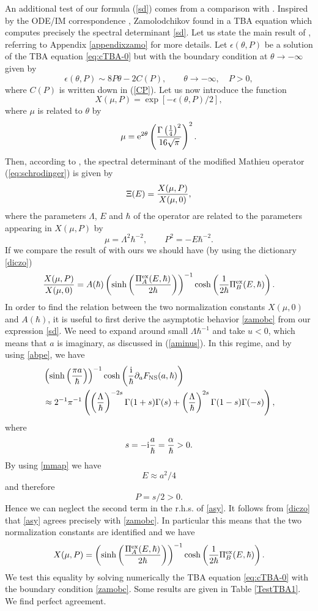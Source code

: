 \documentclass[a4paper,11pt]{article}
\theoremstyle{definition}
\newcommand{\re}{{\rm e}}
\newcommand{\ri}{{\rm i}}
\newcommand{\be}{\begin{equation}}
\newcommand{\ee}{\end{equation}}
\newcommand{\ba}{\begin{aligned}}
\newcommand{\ea}{\end{aligned}}
\begin{document}
\label{comp-zamo}
An additional test of our formula (\ref{sd}) comes from a comparison
with \cite{post-zamo}.  Inspired by the ODE/IM correspondence
\cite{dt,ddt}, Zamolodchikov found in \cite{post-zamo} a TBA equation
which computes precisely the spectral determinant \eqref{sd}. Let us
state the main result of \cite{post-zamo}, referring to Appendix
\ref{appendixzamo} for more details. Let $\epsilon(\theta, P)$ be a
solution of the TBA equation \eqref{eq:cTBA-0} but with the boundary
condition at $\theta \rightarrow -\infty$ given by
%
\begin{equation}
  \label{zamobc}\epsilon (\theta,P) \sim 8 P \theta-2C(P), \qquad \theta \to
   -\infty, \quad P>0,
 \end{equation}
where $C(P)$ is written down in (\ref{CP}). 
Let us now introduce the function 
%
\be X(\mu, P)=\exp\left[-\epsilon(\theta, P)/2\right], 
\ee
%
where $\mu$ is related to $\theta$ by
%
\be
\label{mutheta}
\mu=  \re^{2 \theta}\left(\frac{\Gamma \left(\frac{1}{4}\right)^2}{16 \sqrt{\pi }}\right)^2. 
\ee
%
Then, according to \cite{post-zamo}, the spectral determinant of the modified Mathieu operator (\ref{eq:schrodinger}) is given by 
\be  
\Xi (E)= {X(\mu, P) \over X(\mu, 0)},
\ee
%
where the parameters $\Lambda$, $E$ and $\hbar$ of the operator are related to the parameters appearing in $X(\mu, P)$ by
%
\be \label{diczo} \mu=  \Lambda^2 \hbar^{-2}, \qquad P^2 =-E \hbar^{-2}.
 \ee 
% 
   If we compare the result of \cite{post-zamo} with ours we should have (by using the dictionary \eqref{diczo}) 
 \be {X(\mu, P) \over X(\mu, 0)}=A (\hbar)\left( \sinh\left(\frac{ \Pi_A^{\rm ex}(E, \hbar)}{2 \hbar }\right) \right)^{-1} \cosh\left({1 \over 2\hbar} \Pi_B^{\rm ex}(E, \hbar)\right). 
 \ee
 In order to find the relation between the two normalization constants
 $X(\mu, 0)$ and $A (\hbar)$, it is useful to first derive the
 asymptotic behavior \eqref{zamobc} from our expression \eqref{sd}. We
 need to expand around small $\Lambda \hbar^{-1}$ and take $u<0$,
 which means that $a$ is imaginary, as discussed in (\ref{aminus}). In
 this regime, and by using \eqref{abpe}, we have
 \be 
 \ba
 &\label{asy} \left( \sinh\left(\frac{\pi a}{\hbar }\right) \right)^{-1} \cosh \left({\ri \over \hbar}\partial_{a}F_{\rm NS}(a, \hbar)\right)\\
 & \approx  2^{-1}\pi^{-1}\left(\left({\Lambda\over\hbar}\right)^{-2s }\Gamma(1+s)\Gamma(s)+\left({\Lambda\over\hbar}\right)^{2s }\Gamma(1-s)\Gamma(-s)\right),
 \ea
 \ee
 where 
 \be s=-\ri {a \over \hbar} = \frac{\alpha}{\hbar} > 0.
 \ee
By using \eqref{mmap} we have 
%
\be 
E \approx a^2/4 
\ee
% 
and therefore 
%
 \be P =s/2 >0.
 \ee
Hence we can neglect the second term in the r.h.s. of \eqref{asy}. It follows from \eqref{diczo} that \eqref{asy} agrees precisely with \eqref{zamobc}. 
In particular this means that the two normalization constants are identified and we have
%
\be \label{IDtest} X(\mu, P)= \left( \sinh\left(\frac{ \Pi_A^{\rm ex}(E, \hbar)}{2 \hbar }\right) \right)^{-1} \cosh\left({1 \over 2\hbar} \Pi_B^{\rm ex}(E, \hbar)\right). 
  \ee
We test this equality by solving numerically the TBA equation \eqref{eq:cTBA-0} with the boundary condition \eqref{zamobc}. 
Some results  are given in Table \ref{TestTBA1}. We find perfect agreement. 
\end{document}
